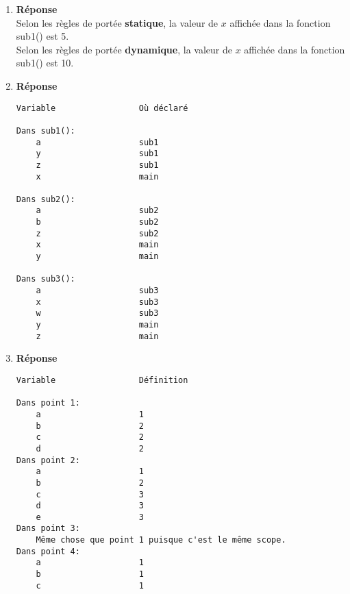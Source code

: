 \documentclass[12pt]{book}
\begin{document}
\newcommand{\reporttitle}{Devoir 2}
\newcommand{\reportauthorOne}{Kien Do}
\newcommand{\cidOne}{300163370}






\begin{enumerate}
    \item \textbf{Réponse}\\
    
    Selon les règles de portée \textbf{statique}, la valeur de $x$ affichée dans la fonction sub1() est 5.\\
    Selon les règles de portée \textbf{dynamique}, la valeur de $x$ affichée dans la fonction sub1() est 10.
    \item \textbf{Réponse}
\begin{verbatim}
Variable                 Où déclaré

Dans sub1():
    a                    sub1
    y                    sub1
    z                    sub1
    x                    main
    
Dans sub2():
    a                    sub2
    b                    sub2
    z                    sub2
    x                    main
    y                    main

Dans sub3():
    a                    sub3
    x                    sub3
    w                    sub3
    y                    main
    z                    main
\end{verbatim}
    \item \textbf{Réponse}
\begin{verbatim}
Variable                 Définition

Dans point 1:
    a                    1
    b                    2
    c                    2
    d                    2
Dans point 2:
    a                    1
    b                    2
    c                    3
    d                    3
    e                    3
Dans point 3:
    Même chose que point 1 puisque c'est le même scope.
Dans point 4:
    a                    1
    b                    1
    c                    1
\end{verbatim}

\newpage


\end{enumerate}
\end{document}
